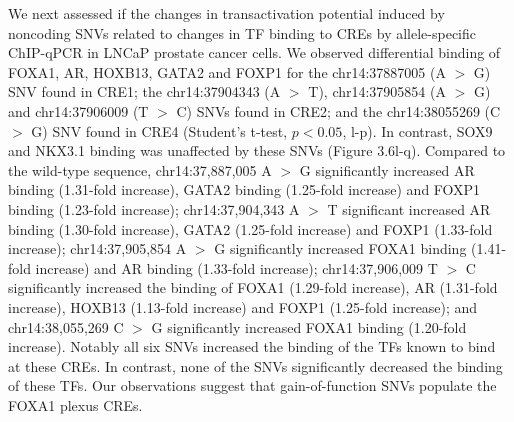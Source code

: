 We next assessed if the changes in transactivation potential induced by noncoding SNVs related to changes in TF binding to CREs by allele-specific ChIP-qPCR \cite{baileyNoncodingSomaticInherited2016,zhangIntegrativeFunctionalGenomics2012,cowper-sal*lariBreastCancerRisk2012} in LNCaP prostate cancer cells.
We observed differential binding of FOXA1, AR, HOXB13, GATA2 and FOXP1 for the chr14:37887005 (A $>$ G) SNV found in CRE1; the chr14:37904343 (A $>$ T), chr14:37905854 (A $>$ G) and chr14:37906009 (T $>$ C) SNVs found in CRE2; and the chr14:38055269 (C $>$ G) SNV found in CRE4 (Student's t-test, $p<0.05$, l-p).
In contrast, SOX9 and NKX3.1 binding was unaffected by these SNVs (Figure  3.6l-q).
Compared to the wild-type sequence, chr14:37,887,005 A $>$ G significantly increased AR binding (1.31-fold increase), GATA2 binding (1.25-fold increase) and FOXP1 binding (1.23-fold increase); chr14:37,904,343 A $>$ T significant increased AR binding (1.30-fold increase), GATA2 (1.25-fold increase) and FOXP1 (1.33-fold increase); chr14:37,905,854 A $>$ G significantly increased FOXA1 binding (1.41-fold increase) and AR binding (1.33-fold increase); chr14:37,906,009 T $>$ C significantly increased the binding of FOXA1 (1.29-fold increase), AR (1.31-fold increase), HOXB13 (1.13-fold increase) and FOXP1 (1.25-fold increase); and chr14:38,055,269 C $>$ G significantly increased FOXA1 binding (1.20-fold increase).
Notably all six SNVs increased the binding of the TFs known to bind at these CREs.
In contrast, none of the SNVs significantly decreased the binding of these TFs.
Our observations suggest that gain-of-function SNVs populate the FOXA1 plexus CREs.
